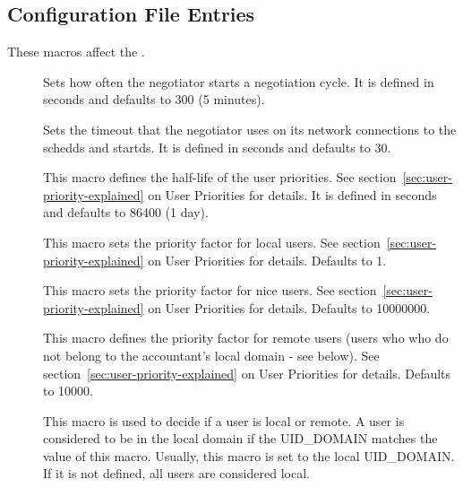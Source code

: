 \subsection{\label{sec:Negotiator-Config-File-Entries}
 Configuration File Entries}

These macros affect the .
\begin{description}
  
\item[] \label{param:NegotiatorInterval}
  Sets how often the negotiator starts a negotiation cycle.  It is defined
  in seconds and defaults to 300 (5 minutes).
  
\item[] \label{param:NegotiatorTimeout}
  Sets the timeout that the negotiator uses on its network connections
  to the schedds and startds.  It is defined in seconds and defaults to 30.
  
\item[] \label{param:PriorityHalfLife} This
  macro defines the half-life of the user priorities.  See
  section~\ref{sec:user-priority-explained}
  on User Priorities for details.  It is defined in seconds and defaults
  to 86400 (1 day).

\item[] \label{param:DefaultPrioFactor} 
  This macro sets the priority factor for local users. See
  section~\ref{sec:user-priority-explained}
  on User Priorities for details.  Defaults to 1.

\item[] \label{param:NiceUserPrioFactor} 
  This macro sets the priority factor for nice users. See
  section~\ref{sec:user-priority-explained}
  on User Priorities for details.  Defaults to 10000000.

\item[] \label{param:RemotePrioFactor} 
  This macro defines the priority factor for remote users (users who
  who do not belong to the accountant's local domain - see
  below). See section~\ref{sec:user-priority-explained}
  on User Priorities for details.  Defaults to 10000.

\item[] \label{param:AccountantLocalDomain} 
  This macro is used to decide if a user is local or remote. A user
  is considered to be in the local domain if the UID\_DOMAIN matches
  the value of this macro. Usually, this macro is set
  to the local UID\_DOMAIN. If it is not defined, all users are considered
  local.


\end{description}
